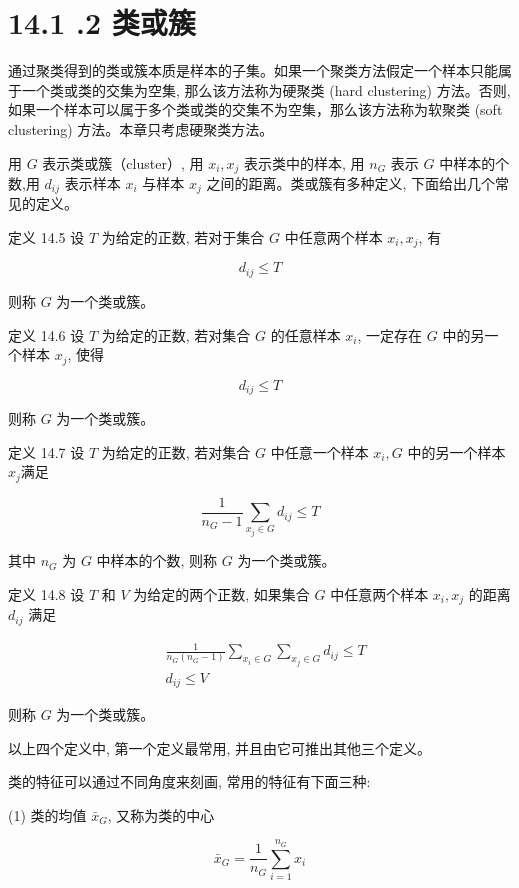 \documentclass[10pt]{article}
\begin{document}
\section*{14.1 .2 类或簇}
通过聚类得到的类或簇本质是样本的子集。如果一个聚类方法假定一个样本只能属于一个类或类的交集为空集, 那么该方法称为硬聚类 (hard clustering) 方法。否则, 如果一个样本可以属于多个类或类的交集不为空集，那么该方法称为软聚类 (soft clustering) 方法。本章只考虑硬聚类方法。

用 $G$ 表示类或簇（cluster）, 用 $x_{i}, x_{j}$ 表示类中的样本, 用 $n_{G}$ 表示 $G$ 中样本的个数,用 $d_{i j}$ 表示样本 $x_{i}$ 与样本 $x_{j}$ 之间的距离。类或簇有多种定义, 下面给出几个常见的定义。

定义 14.5 设 $T$ 为给定的正数, 若对于集合 $G$ 中任意两个样本 $x_{i}, x_{j}$, 有

$$
d_{i j} \leqslant T
$$

则称 $G$ 为一个类或簇。

定义 14.6 设 $T$ 为给定的正数, 若对集合 $G$ 的任意样本 $x_{i}$, 一定存在 $G$ 中的另一个样本 $x_{j}$, 使得

$$
d_{i j} \leqslant T
$$

则称 $G$ 为一个类或簇。

定义 14.7 设 $T$ 为给定的正数, 若对集合 $G$ 中任意一个样本 $x_{i}, G$ 中的另一个样本 $x_{j}$满足

$$
\frac{1}{n_{G}-1} \sum_{x_{j} \in G} d_{i j} \leqslant T
$$

其中 $n_{G}$ 为 $G$ 中样本的个数, 则称 $G$ 为一个类或簇。

定义 14.8 设 $T$ 和 $V$ 为给定的两个正数, 如果集合 $G$ 中任意两个样本 $x_{i}, x_{j}$ 的距离 $d_{i j}$ 满足

$$
\begin{aligned}
& \frac{1}{n_{G}\left(n_{G}-1\right)} \sum_{x_{i} \in G} \sum_{x_{j} \in G} d_{i j} \leqslant T \\
& d_{i j} \leqslant V
\end{aligned}
$$

则称 $G$ 为一个类或簇。

以上四个定义中, 第一个定义最常用, 并且由它可推出其他三个定义。

类的特征可以通过不同角度来刻画, 常用的特征有下面三种:

(1) 类的均值 $\bar{x}_{G}$, 又称为类的中心


\begin{equation*}
\bar{x}_{G}=\frac{1}{n_{G}} \sum_{i=1}^{n_{G}} x_{i} \tag{14.10}
\end{equation*}
\end{document}
